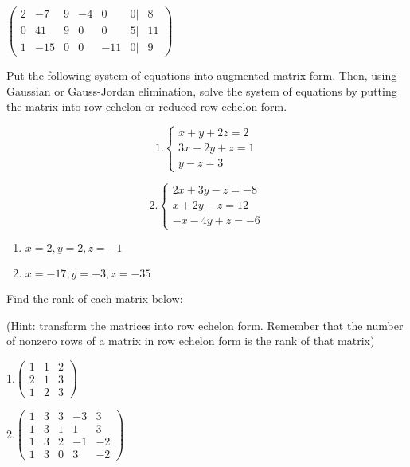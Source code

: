 \documentclass[
]{article}
\begin{document}
\begin{answer}
$\begin{pmatrix}
2 & -7 & 9 & -4 & 0 & 0| & 8\\
0 & 41 & 9 & 0 & 0 & 5 | & 11\\
1 & -15 & 0 & 0 & -11 & 0 | & 9
\end{pmatrix}$
\end{answer}

\begin{exercise}
\protect\hypertarget{exr:solvesys1}{}\label{exr:solvesys1}Put the following system of equations into augmented matrix form. Then, using Gaussian or Gauss-Jordan elimination, solve the system of equations by putting the matrix into row echelon or reduced row echelon form.

\[
  1. \begin{cases}
               x + y + 2z = 2\\
               3x - 2y + z = 1\\
               y - z = 3
            \end{cases}
               \]

\[
  2. \begin{cases}
               2x + 3y - z = -8\\
               x + 2y - z = 12\\
             -x -4y + z = -6
            \end{cases}
               \]
\end{exercise}

\begin{answer}
\begin{enumerate}
\item $x = 2, y = 2, z = -1$
\item $x = -17, y = -3, z = -35$
\end{enumerate}
\end{answer}

\begin{exercise}
\protect\hypertarget{exr:rank}{}\label{exr:rank}Find the rank of each matrix below:

(Hint: transform the matrices into row echelon form. Remember that the number of nonzero rows of a matrix in row echelon form is the rank of that matrix)

1.\(\begin{pmatrix} 1 & 1 & 2 \\ 2 & 1 & 3 \\ 1 & 2 & 3 \end{pmatrix}\)

\bigskip

2.\(\begin{pmatrix} 1 & 3 & 3 & -3 & 3\\ 1 & 3 & 1 & 1 & 3 \\ 1 & 3 & 2 & -1 & -2 \\ 1 & 3 & 0 & 3 & -2 \end{pmatrix}\)
\end{exercise}
\end{document}

